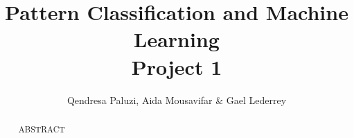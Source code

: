 \documentclass[10pt,conference,compsocconf]{IEEEtran}
\begin{document}
\title{Pattern Classification and Machine Learning \\ {\small Project 1}}

\author{
  Qendresa Paluzi, Aida Mousavifar \& Gael Lederrey
}

\maketitle

\begin{abstract}
  ABSTRACT
\end{abstract}



\end{document}
